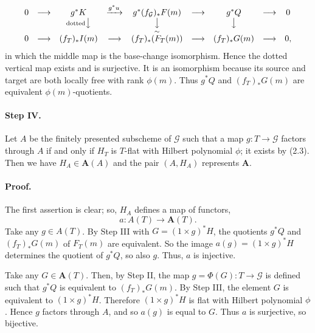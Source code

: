 

\DeclareMathOperator{\Sym}{Sym}


\[
\begin{array}{ccccccccc}
0&\longrightarrow&g^*K&\xrightarrow{g^*u}&g^*(f_{\mathcal G})_*F(m)
&\longrightarrow&g^*Q&\longrightarrow&0
\\
&&{\scriptstyle\mathrm{dotted}}\big\downarrow
&&\underset{\sim}{\big\downarrow}
&&\big\downarrow
\\
0&\longrightarrow&(f_T)_*I(m)&\longrightarrow&(f_T)_*(F_T(m))
&\longrightarrow&(f_T)_*G(m)&\longrightarrow&0,
\end{array}
\]
in which the middle map is the base-change isomorphism. Hence the dotted
vertical map exists and is surjective. It is an isomorphism because its
source and target are both locally free with rank $\phi(m)$. Thus $g^*Q$ and
$(f_T)_*G(m)$ are equivalent $\phi(m)$-quotients.

\paragraph{Step IV.}
Let $A$ be the finitely presented subscheme of $\mathcal G$ such that a map
$g:T\to\mathcal G$ factors through $A$ if and only if $H_T$ is $T$-flat
with Hilbert polynomial $\phi$; it exists by (2.3). Then we have
$H_A\in\mathbf A(A)$ and the pair $(A,H_A)$ represents $\mathbf A$.

\paragraph{Proof.}
The first assertion is clear; so, $H_A$ defines a map of functors,
\[
a:A(T)\longrightarrow\mathbf A(T).
\]
Take any $g\in A(T)$. By Step III with $G=(1\times g)^*H$, the quotients
$g^*Q$ and $(f_T)_*G(m)$ of $F_T(m)$ are equivalent. So the image
$a(g)=(1\times g)^*H$ determines the quotient of $g^*Q$, so also $g$. Thus,
$a$ is injective.

Take any $G\in\mathbf A(T)$. Then, by Step II, the map
$g=\Phi(G):T\to\mathcal G$ is defined such that $g^*Q$ is equivalent to
$(f_T)_*G(m)$. By Step III, the element $G$ is equivalent to
$(1\times g)^*H$. Therefore $(1\times g)^*H$ is flat with Hilbert
polynomial $\phi$. Hence $g$ factors through $A$, and so $a(g)$ is equal to
$G$. Thus $a$ is surjective, so bijective.

